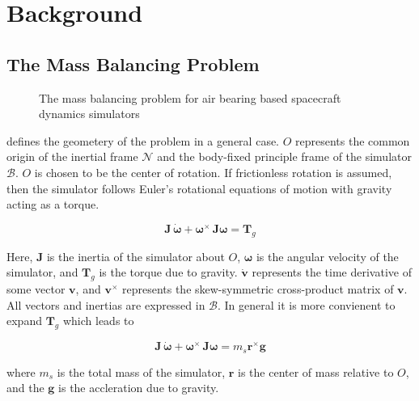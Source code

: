 \chapter{Background}\label{chap:background}
\section{The Mass Balancing Problem}\label{sec:mbs_problem}

\begin{figure}
    \centering
    
    \caption{The mass balancing problem for air bearing based spacecraft dynamics simulators}
    \label{fig:mbs_problem}
\end{figure}


 defines the geometery of the problem in a general case. $O$ represents the common origin of the inertial frame $\mathcal{N}$ and the body-fixed principle frame of the simulator $\mathcal{B}$. $O$ is chosen to be the center of rotation. If frictionless rotation is assumed, then the simulator follows Euler's rotational equations of motion with gravity acting as a torque. 

\begin{equation}
    \bm{J}\,\dot{\bm{\omega}} + \bm{\omega}^{\times}\,\bm{J}\bm{\omega} = \bm{T}_g
\end{equation}

Here, $\bm{J}$ is the inertia of the simulator about $O$, $\bm{\omega}$ is the angular velocity of the simulator, and $\bm{T}_g$ is the torque due to gravity. $\dot{\bm{v}}$ represents the time derivative of some vector $\bm{v}$, and $\bm{v}^{\times}$ represents the skew-symmetric cross-product matrix of $\bm{v}$. All vectors and inertias are expressed in $\mathcal{B}$. In general it is more convienent to expand $\bm{T}_g$ which leads to

\begin{equation}\label{equation:starting_eom}
    \bm{J}\,\dot{\bm{\omega}} + \bm{\omega}^{\times}\,\bm{J}\bm{\omega} = m_s\bm{r}^{\times}\bm{g}
\end{equation}

where $m_s$ is the total mass of the simulator, $\bm{r}$ is the center of mass relative to $O$, and the $\bm{g}$ is the accleration due to gravity.

